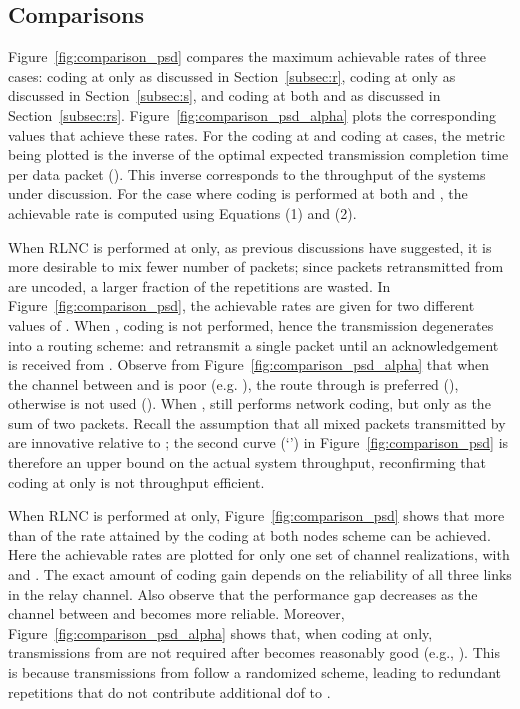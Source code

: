 \documentclass[journal, letterpaper]{IEEEtran}
\begin{document}
\begin{itemize}
\subsection{Comparisons}\label{subsec:comparison}

Figure~\ref{fig:comparison_psd} compares the maximum achievable rates of three cases: coding at  only as discussed in Section~\ref{subsec:r}, coding at  only as discussed in Section~\ref{subsec:s}, and coding at both  and  as discussed in Section~\ref{subsec:rs}. Figure~\ref{fig:comparison_psd_alpha} plots the corresponding  values that achieve these rates. For the coding at  and coding at  cases, the metric being plotted is the inverse of the optimal expected transmission completion time per data packet (). This inverse corresponds to the throughput  of the systems under discussion. For the case where coding is performed at both  and , the achievable rate is computed using Equations (1) and (2).

When RLNC is performed at  only, as previous discussions have suggested, it is more desirable to mix fewer number of packets; since packets retransmitted from  are uncoded, a larger fraction of the repetitions are wasted. In Figure~\ref{fig:comparison_psd}, the achievable rates are given for two different values of . When , coding is not performed, hence the transmission degenerates into a routing scheme:  and  retransmit a single packet until an acknowledgement is received from . Observe from Figure~\ref{fig:comparison_psd_alpha} that when the channel between  and  is poor (e.g. ), the route through  is preferred (), otherwise  is not used (). When ,  still performs network coding, but only as the sum of two packets. Recall the assumption that all mixed packets transmitted by  are innovative relative to ; the second curve (`') in Figure~\ref{fig:comparison_psd} is therefore an upper bound on the actual system throughput, reconfirming that coding at  only is not throughput efficient.

When RLNC is performed at  only, Figure~\ref{fig:comparison_psd} shows that more than  of the rate attained by the coding at both nodes scheme can be achieved. Here the achievable rates are plotted for only one set of channel realizations, with  and . The exact amount of coding gain depends on the reliability of all three links in the relay channel. Also observe that the performance gap decreases as the channel between  and  becomes more reliable. Moreover, Figure~\ref{fig:comparison_psd_alpha} shows that, when coding at  only, transmissions from  are not required after  becomes reasonably good (e.g., ). This is because transmissions from  follow a randomized scheme, leading to redundant repetitions that do not contribute additional dof to .


\end{itemize}
\end{document}
